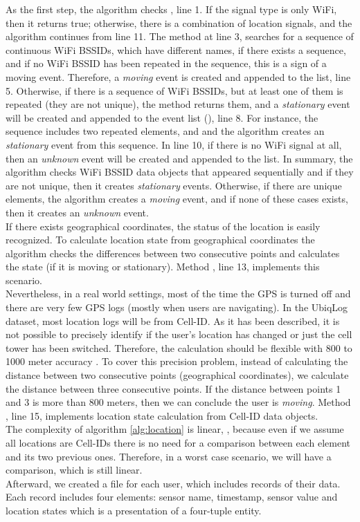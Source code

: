 \documentclass{sig-alternate}
\begin{document}
As the first step, the algorithm checks , line 1. If the signal type is only WiFi, then it returns true; otherwise, there is a combination of location signals, and the algorithm continues from line 11. The  method at line 3, searches for a sequence of continuous WiFi BSSIDs, which have different names, if there exists a sequence, and if no WiFi BSSID has been repeated in the sequence, this is a sign of a moving event. Therefore, a \emph{moving} event is created and appended to the  list, line 5. Otherwise, if there is a sequence of WiFi BSSIDs, but at least one of them is repeated (they are not unique), the  method returns them, and a \emph{stationary} event will be created and appended to the event list (), line 8. For instance, the sequence  includes two repeated elements,  and  and the algorithm creates an \emph{stationary} event from this sequence. In line 10, if there is no WiFi signal at all, then an \emph{unknown} event will be created and appended to the  list. In summary, the algorithm checks WiFi BSSID data objects that appeared sequentially and if they are not unique, then it creates \emph{stationary} events. Otherwise, if there are unique elements, the algorithm creates a \emph{moving} event, and if none of these cases exists, then it creates an \emph{unknown} event. \\
If there exists geographical coordinates, the status of the location is easily recognized. To calculate location state from geographical coordinates the algorithm checks the differences between two consecutive points and calculates the state (if it is moving or stationary). Method , line 13, implements this scenario. \\
Nevertheless, in a real world settings, most of the time the GPS is turned off and there are very few GPS logs (mostly when users are navigating). In the UbiqLog dataset, most location logs will be from Cell-ID. As it has been described, it is not possible to precisely identify if the user's location has changed or just the cell tower has been switched. Therefore, the calculation should be flexible with 800 to 1000 meter accuracy \cite{discgps}. To cover this precision problem, instead of calculating the distance between two consecutive points (geographical coordinates), we calculate the distance between three consecutive points. If the distance between points 1 and 3 is more than 800 meters, then we can conclude the user is \emph{moving}. Method , line 15, implements location state calculation from Cell-ID data objects.\\ 
The complexity of algorithm \ref{alg:location} is linear, , because even if we assume all locations are Cell-IDs there is no need for a comparison between each element and its two previous ones. Therefore, in a worst case scenario, we will have a  comparison, which is still linear.\\
Afterward, we created a file for each user, which includes records of their data. Each record includes four elements: sensor name, timestamp, sensor value and location states which is a presentation of a four-tuple entity.
\end{document}

